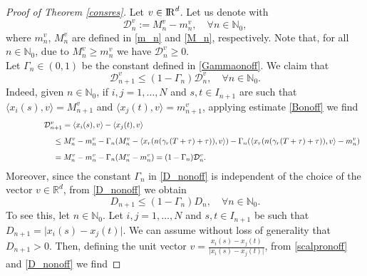\documentclass[11pt]{article}
\newcommand{\RR}{{{\rm I} \kern -.15em {\rm R} }}
\begin{document}
	\begin{proof}[Proof of Theorem \ref{consres}]
		Let $v\in \RR^d$. Let us denote with $$\mathcal{D}^v_n:=M^v_n-m^v_n,\quad \forall n\in \mathbb{N}_0,$$
		where $m_n^v$, $M_n^v$ are defined in \eqref{m_n} and \eqref{M_n}, respectively. Note that, for all $n\in \mathbb{N}_0$, due to $M_n^v\geq m_n^v$ we have $\mathcal{D}^v_n\geq 0$.
		\\Let $\Gamma_n\in (0,1)$ be the constant defined in \eqref{Gammaonoff}. We claim that
		\begin{equation}\label{D_nonoff}
			\mathcal{D}^v_{n+1}\leq (1-\Gamma_n)\mathcal{D}_{n}^v,\quad \forall n\in \mathbb{N}_0.
		\end{equation}
		Indeed, given $n\in \mathbb{N}_0$, if $i,j=1,\dots,N$ and $s,t\in I_{n+1}$ are such that $\langle x_i(s),v\rangle=M^v_{n+1}$ and $\langle x_j(t),v\rangle=m^v_{n+1}$, applying estimate \eqref{Bonoff} we find 
		\begin{equation}\label{calD}
			\begin{array}{l}
            \vspace{0.3cm}\displaystyle{\hspace{1.5cm}\mathcal{D}^v_{n+1}=\langle x_i(s),v\rangle-\langle x_j(t),v\rangle}\\
				\vspace{0.3cm}\displaystyle{\hspace{2cm}\leq M_{n}^v-m_{n}^v-\Gamma_n(M_{n}^v-\langle x_r(n(\gamma_r(T+\tau)+\tau)),v \rangle)-\Gamma_n(\langle x_r(n(\gamma_r(T+\tau)+\tau)),v \rangle-m_{n}^v)} \\
                \displaystyle{\hspace{2cm}=M_{n}^v-m_{n}^v-\Gamma_n(M_{n}^v-m_{n}^v)=(1-\Gamma_n)\mathcal{D}_n^v.}                
			\end{array}
		\end{equation}
		Moreover, since the constant $\Gamma_n$ in \eqref{D_nonoff} is independent of the choice of the vector $v\in\mathbb{R}^d$, from \eqref{D_nonoff} we obtain
		\begin{equation}\label{deconoff}
			D_{n+1}\leq (1-\Gamma_n)D_{n},\quad \forall n\in \mathbb{N}_0.
		\end{equation}
	To see this, let $n\in \mathbb{N}_0$. Let $i,j=1,\dots,N$ and $s,t\in I_{n+1}$ be such that $D_{n+1}=\lvert x_i(s)-x_j(t)\rvert.$ We can assume without loss of generality that $D_{n+1}>0$. Then, defining the unit vector $v = \frac{x_i(s)-x_j(t)}{\lvert x_i(s)-x_j(t)\rvert}$, from \eqref{scalpronoff} and \eqref{D_nonoff} we find

\end{proof}
\end{document}
